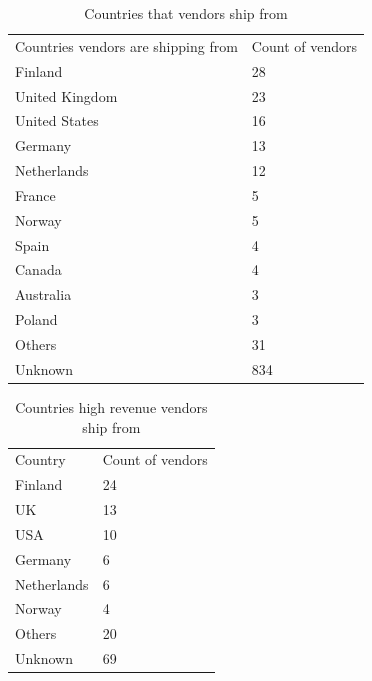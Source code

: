 \documentclass[
  digital, %
  table,   %
  lof,     %
  lot,     %
  oneside
]{fithesis3}
\begin{document}
\begin{table}
    \caption{Countries that vendors ship from}
    \label{shipcount}
    \begin{tabular}{|l|l|}
    Countries vendors are shipping from  & Count of vendors\\
        Finland                                      & 28  \\ 
        United Kingdom                               & 23  \\ 
        United States                                & 16  \\ 
        Germany                                      & 13  \\ 
        Netherlands                                  & 12  \\ 
        France                                       & 5   \\ 
        Norway                                       & 5   \\ 
        Spain                                        & 4   \\ 
        Canada                                       & 4   \\ 
        Australia                                    & 3   \\ 
        Poland                                       & 3  \\  
        Others                                       & 31   \\
        Unknown                                      & 834  \\
    \end{tabular}
\end{table}

\begin{table}
    \caption{Countries high revenue vendors ship from}
    \label{richvendors}
    \begin{tabular}{|l|l|}
    Country & Count of vendors\\
Finland & 24 \\
UK & 13 \\
USA & 10 \\
Germany & 6 \\
Netherlands & 6 \\
Norway & 4 \\
Others & 20 \\ 
Unknown & 69 \\
    \end{tabular}
\end{table}
\end{document}
